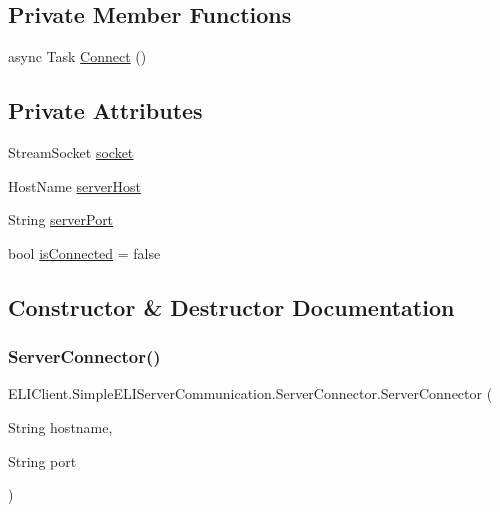 \subsection*{Private Member Functions}
\begin{DoxyCompactItemize}
\item 
async Task \hyperlink{class_e_l_i_client_1_1_simple_e_l_i_server_communication_1_1_server_connector_a71309c0a8d78df03c57c74b7da8b360a}{Connect} ()
\end{DoxyCompactItemize}
\subsection*{Private Attributes}
\begin{DoxyCompactItemize}
\item 
Stream\+Socket \hyperlink{class_e_l_i_client_1_1_simple_e_l_i_server_communication_1_1_server_connector_add9c36f3ca36f096570915423fd01522}{socket}
\item 
Host\+Name \hyperlink{class_e_l_i_client_1_1_simple_e_l_i_server_communication_1_1_server_connector_ab925d748f9a9b359302e877cb8c6c9b6}{server\+Host}
\item 
String \hyperlink{class_e_l_i_client_1_1_simple_e_l_i_server_communication_1_1_server_connector_a821828ede549ca68c383949588a5f5e1}{server\+Port}
\item 
bool \hyperlink{class_e_l_i_client_1_1_simple_e_l_i_server_communication_1_1_server_connector_a601bc05dedac1a49b3ec77ce7279362a}{is\+Connected} = false
\end{DoxyCompactItemize}


\subsection{Constructor \& Destructor Documentation}
\mbox{\label{class_e_l_i_client_1_1_simple_e_l_i_server_communication_1_1_server_connector_ad9a29fa265ea9a860f92ed58c11858e6}} 
\subsubsection{\texorpdfstring{Server\+Connector()}{ServerConnector()}}
{\footnotesize\ttfamily E\+L\+I\+Client.\+Simple\+E\+L\+I\+Server\+Communication.\+Server\+Connector.\+Server\+Connector (\begin{DoxyParamCaption}\item[{String}]{hostname,  }\item[{String}]{port }\end{DoxyParamCaption})\hspace{0.3cm}{\ttfamily [inline]}}




